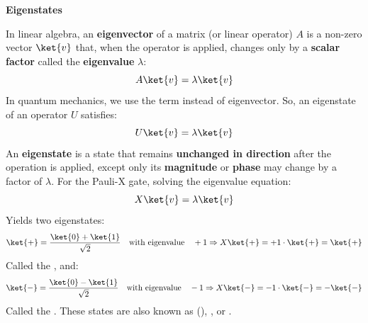 \begin{flushleft}
   \textcolor{Green3}{ \textbf{Eigenstates}}
\end{flushleft}
In linear algebra, an \textbf{eigenvector} of a matrix (or linear operator) $A$ is a non-zero vector $\ket{v}$ that, when the operator is applied, changes only by a \textbf{scalar factor} called the \textbf{eigenvalue} $\lambda$:
\begin{equation*}
   A\ket{v} = \lambda \ket{v}
\end{equation*}
In quantum mechanics, we use the term  instead of eigenvector. So, an eigenstate of an operator $U$ satisfies:
\begin{equation*}
   U\ket{v} = \lambda \ket{v}
\end{equation*}
An \textbf{eigenstate} is a state that remains \textbf{unchanged in direction} after the operation is applied, except only its \textbf{magnitude} or \textbf{phase} may change by a factor of $\lambda$. For the Pauli-X gate, solving the eigenvalue equation:
\begin{equation*}
   X\ket{v} = \lambda \ket{v}
\end{equation*}
Yields two eigenstates:
\begin{equation}\label{eq:plus-state}
   \ket{+} = \dfrac{\ket{0} + \ket{1}}{\sqrt{2}} \quad \text{with eigenvalue} \quad +1 \Rightarrow X\ket{+} = +1 \cdot \ket{+} = \ket{+}
\end{equation}
Called the , and:
\begin{equation}\label{eq:minus-state}
   \ket{-} = \dfrac{\ket{0} - \ket{1}}{\sqrt{2}} \quad \text{with eigenvalue} \quad -1 \Rightarrow X\ket{-} = -1 \cdot \ket{-} = -\ket{-}
\end{equation}
Called the . These states are also known as  (), , or .

